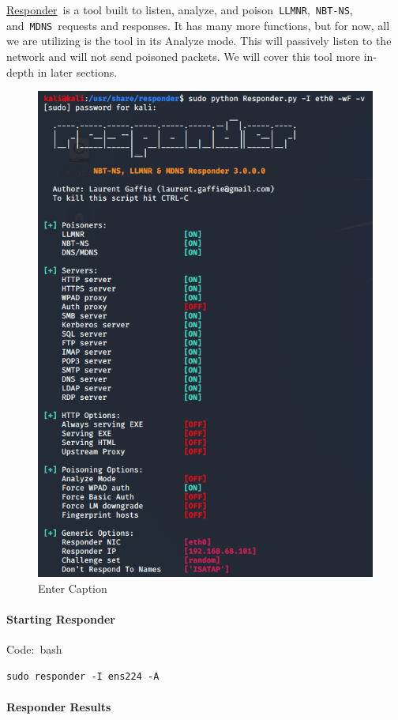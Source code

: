 \href{https://github.com/lgandx/Responder-Windows}{Responder} is a tool built to listen, analyze, and poison \verb|LLMNR|, \verb|NBT-NS|, and \verb|MDNS| requests and responses. It has many more functions, but for now, all we are utilizing is the tool in its Analyze mode. This will passively listen to the network and will not send poisoned packets. We will cover this tool more in-depth in later sections.
\begin{figure}
    \centering
    \includegraphics[width=0.75\linewidth]{responder.png}
    \caption{Enter Caption}
    \label{fig:placeholder}
\end{figure}
\paragraph{Starting Responder}

Code: bash

\begin{verbatim}
sudo responder -I ens224 -A 
\end{verbatim}

\paragraph{Responder Results}

